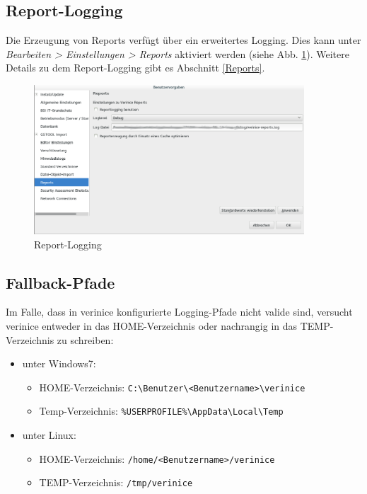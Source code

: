 \documentclass[a4paper,10pt]{book}
\begin{document}
\subsection{Report-Logging}
\label{sec:report-logging}

Die Erzeugung von Reports verfügt über ein erweitertes Logging. Dies
kann unter \textit{Bearbeiten > Einstellungen > Reports} aktiviert
werden (siehe Abb. \ref{fig:report-logging}). Weitere Details zu dem
Report-Logging gibt es Abschnitt \ref{Reports}.

\begin{figure}[ht]
  \centering
  \includegraphics[width=0.9\textwidth]{Screenshot/report-logging.png}
  \caption{Report-Logging}
  \label{fig:report-logging}
\end{figure}

\subsection{Fallback-Pfade}
\label{fallback-logging}

Im Falle, dass in verinice konfigurierte Logging-Pfade nicht valide
sind, versucht verinice entweder in das HOME-Verzeichnis oder
nachrangig in das TEMP-Verzeichnis zu schreiben:

\begin{itemize}

\item unter Windows7:

  \begin{itemize}
  \item HOME-Verzeichnis:
    \texttt{C:\textbackslash Benutzer\textbackslash <Benutzername>\textbackslash verinice}
  \item Temp-Verzeichnis:
    \texttt{\%USERPROFILE\%\textbackslash AppData\textbackslash Local\textbackslash Temp}
  \end{itemize}

\item unter Linux:
  \begin{itemize}
  \item HOME-Verzeichnis: \texttt{/home/<Benutzername>/verinice}
  \item TEMP-Verzeichnis: \texttt{/tmp/verinice}
  \end{itemize}
\end{itemize}
\end{document}
